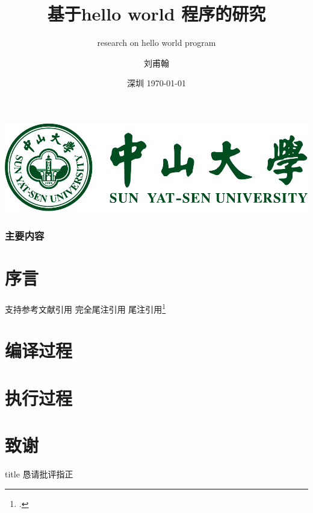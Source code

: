 \documentclass[]{SYSUslide1}
\title[中山大学]{基于hello world 程序的研究}
\subtitle{research on hello world program}
\author[刘至憨]{刘甫翰}
\institute[航空航天学院]{
  中山大学

  航空航天学院
}
\date[深圳 \today]{深圳 \today}
\begin{document}
\frame{\titlepage}

{
    \raggedright
    \includegraphics[trim=-680pt 0 0 -200pt,height=0.8\paperheight]{pic/SYSULogo.pdf}
}
\begin{frame}
\frametitle{主要内容}
\tableofcontents
\end{frame}

\section{序言}

\begin{frame}
    支持参考文献引用\cite{origin}
    完全尾注引用
    尾注引用\footcite{origin}
\end{frame}

\section{编译过程}

\section{执行过程}

\section*{致谢}  
\begin{frame}
\vfill
\centering
\begin{beamercolorbox}[sep=8pt,center,shadow=true,rounded=true]{title}
  \Huge{恳请批评指正}
\end{beamercolorbox}
\vfill
\end{frame}
\end{document}
